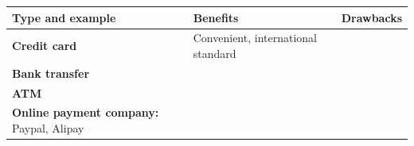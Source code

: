 \documentclass[]{book}
\begin{document}
\begin{longtable}[]{@{}lll@{}}
\toprule
\begin{minipage}[b]{0.28\columnwidth}\raggedright
Type and example\strut
\end{minipage} & \begin{minipage}[b]{0.30\columnwidth}\raggedright
Benefits\strut
\end{minipage} & \begin{minipage}[b]{0.34\columnwidth}\raggedright
Drawbacks\strut
\end{minipage}\tabularnewline
\midrule
\endhead
\begin{minipage}[t]{0.28\columnwidth}\raggedright
\textbf{Credit card}\strut
\end{minipage} & \begin{minipage}[t]{0.30\columnwidth}\raggedright
Convenient, international standard\strut
\end{minipage} & \begin{minipage}[t]{0.34\columnwidth}\raggedright
\strut
\end{minipage}\tabularnewline
\begin{minipage}[t]{0.28\columnwidth}\raggedright
\textbf{Bank transfer}\strut
\end{minipage} & \begin{minipage}[t]{0.30\columnwidth}\raggedright
\strut
\end{minipage} & \begin{minipage}[t]{0.34\columnwidth}\raggedright
\strut
\end{minipage}\tabularnewline
\begin{minipage}[t]{0.28\columnwidth}\raggedright
\textbf{ATM}\strut
\end{minipage} & \begin{minipage}[t]{0.30\columnwidth}\raggedright
\strut
\end{minipage} & \begin{minipage}[t]{0.34\columnwidth}\raggedright
\strut
\end{minipage}\tabularnewline
\begin{minipage}[t]{0.28\columnwidth}\raggedright
\textbf{Online payment company:} Paypal, Alipay\strut
\end{minipage} & \begin{minipage}[t]{0.30\columnwidth}\raggedright
\strut
\end{minipage} & \begin{minipage}[t]{0.34\columnwidth}\raggedright
\strut
\end{minipage}\tabularnewline

\end{longtable}
\end{document}
